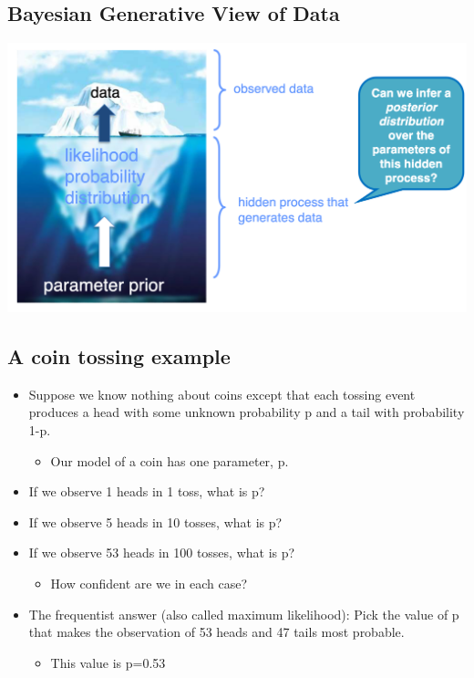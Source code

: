 \documentclass[11pt]{article}
\theoremstyle{definition}
\begin{document}
\subsection{Bayesian Generative View of Data}
\includegraphics[width=\textwidth]{3.png}

\subsection{A coin tossing example}
\begin{itemize}
    \item Suppose we know nothing about coins except that each tossing
    event produces a head with some unknown probability p and a
    tail with probability 1-p.
    \begin{itemize}
        \item Our model of a coin has one parameter, p.
    \end{itemize}
    \item If we observe 1 heads in 1 toss, what is p?
    \item If we observe 5 heads in 10 tosses, what is p?
    \item If we observe 53 heads in 100 tosses, what is p?
    \begin{itemize}
        \item How confident are we in each case?
    \end{itemize}
    \item The frequentist answer (also called maximum likelihood):
    Pick the value of p that makes the observation of 53 heads and
    47 tails most probable.
    \begin{itemize}
        \item This value is p=0.53
    \end{itemize}
\end{itemize}
\end{document}
